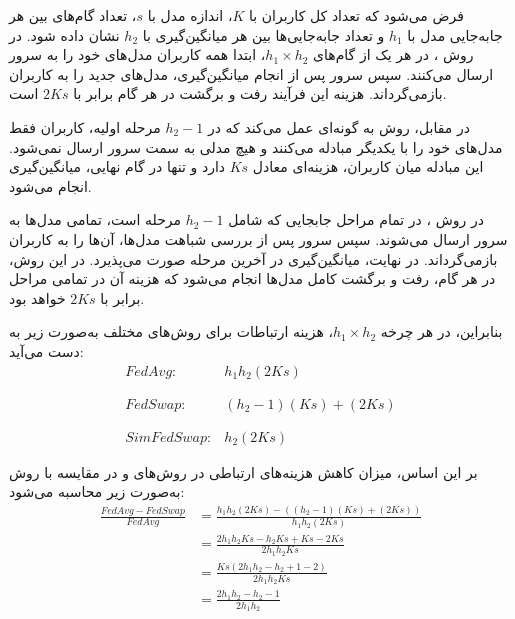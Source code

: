 فرض می‌شود که تعداد کل کاربران با \(K\)، اندازه مدل با \(s\)، تعداد گام‌های بین هر جابه‌جایی مدل با \(h_1\) و تعداد جابه‌جایی‌ها بین هر میانگین‌گیری با \(h_2\) نشان داده شود.
در روش ، در هر یک از گام‌های \( h_1 \times h_2 \)، ابتدا همه کاربران مدل‌های خود را به سرور ارسال می‌کنند. سپس سرور پس از انجام میانگین‌گیری، مدل‌های جدید را به کاربران بازمی‌گرداند. هزینه این فرآیند رفت و برگشت در هر گام برابر با \( 2Ks \) است.

در مقابل، روش  به گونه‌ای عمل می‌کند که در \( h_2 - 1 \) مرحله اولیه، کاربران فقط مدل‌های خود را با یکدیگر مبادله می‌کنند و هیچ مدلی به سمت سرور ارسال نمی‌شود. این مبادله میان کاربران، هزینه‌ای معادل \( Ks \) دارد و تنها در گام نهایی، میانگین‌گیری انجام می‌شود.

در روش ، در تمام مراحل جابجایی که شامل \( h_2 - 1 \) مرحله است، تمامی مدل‌ها به سرور ارسال می‌شوند. سپس سرور پس از بررسی شباهت مدل‌ها، آن‌ها را به کاربران بازمی‌گرداند. در نهایت، میانگین‌گیری در آخرین مرحله صورت می‌پذیرد. در این روش، در هر گام، رفت و برگشت کامل مدل‌ها انجام می‌شود که هزینه آن در تمامی مراحل برابر با \( 2Ks \) خواهد بود.

بنابراین، در هر چرخه \( h_1 \times h_2 \)، هزینه ارتباطات برای روش‌های مختلف به‌صورت زیر به دست می‌آید:
\begin{equation}
	\begin{array}{ll}
		FedAvg: & h_1h_2 (2Ks)
		\\ \\ \\
		FedSwap: & (h_2-1)(Ks) + (2Ks)
		\\ \\ \\
		SimFedSwap: & h_2(2Ks)
	\end{array}
\end{equation}


بر این اساس، میزان کاهش هزینه‌های ارتباطی در روش‌های  و  در مقایسه با روش  به‌صورت زیر محاسبه می‌شود:
\begingroup
\addtolength{\jot}{0.5em}
\begin{equation}
	\begin{aligned} 
		\frac{FedAvg-FedSwap}{FedAvg}
		&= \frac{h_1h_2(2Ks)-((h_2-1)(Ks)+(2Ks))}{h_1h_2(2Ks)} \\
		&= \frac{2h_1h_2Ks-h_2Ks+Ks-2Ks}{2h_1h_2Ks} \\
		&= \frac{Ks(2h_1h_2 -h_2 +1 -2)}{2h_1h_2Ks} \\
		&= \frac{2h_1h_2 -h_2 -1}{2h_1h_2}
	\end{aligned}
\end{equation}
\endgroup

